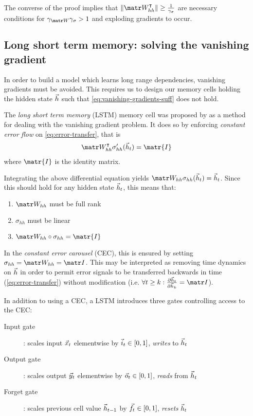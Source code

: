 The converse of the proof implies that $\| \W_{hh}^\tp \| \geq
\frac{1}{\gamma_\sigma}$ are necessary conditions for $\gamma_{\W}
\gamma_\sigma > 1$ and exploding gradients to occur.

\subsection{Long short term memory: solving the vanishing gradient}


In order to build a model which learns long range dependencies, vanishing
gradients must be avoided. This requires us to design our memory cells holding
the hidden state $\vec{h}$ such that \cref{eq:vanishing-gradients-suff} does
not hold.

The \emph{long short term memory} (LSTM) memory cell was proposed by
\citet{hochreiter1997long} as a method for dealing with the vanishing gradient
problem. It does so by enforcing \emph{constant error flow} on
\cref{eq:error-transfer}, that is
\begin{equation}
    \W_{hh}^\tp \sigma_{hh}' (\h_{t}) = \matr{I}
\end{equation}
where $\matr{I}$ is the identity matrix.

Integrating the above differential equation yields $\W_{hh} \sigma_{hh}(\h_{t}) = \h_{t}$.
Since this should hold for any hidden state $\vec{h}_{t}$, this means that:
\begin{enumerate}
    \item $\W_{hh}$ must be full rank
    \item $\sigma_{hh}$ must be linear
    \item $\W_{hh} \circ \sigma_{hh} = \matr{I}$
\end{enumerate}

In the \emph{constant error carousel} (CEC), this is ensured by setting
$\sigma_{hh} = \W_{hh} = \I$. This may be interpreted as removing time dynamics
on $\vec{h}$ in order to permit error signals to be transferred backwards in time
(\cref{eq:error-transfer}) without modification (i.e. $\forall t \geq k: \frac{\pd
\h_t}{\pd \h_k} = \I$).

In addition to using a CEC, a LSTM introduces three gates controlling access to the CEC:
\begin{description}
  \item[Input gate]: scales input $\vec{x}_t$ elementwise by $\vec{i}_t \in [0,1]$, \emph{writes} to $\vec{h}_t$
  \item[Output gate]: scales output $\vec{y}_t$ elementwise by $\vec{o}_t \in [0,1]$, \emph{reads} from $\vec{h}_t$
  \item[Forget gate]: scales previous cell value $\vec{h}_{t-1}$ by $\vec{f}_t \in [0,1]$, \emph{resets} $\vec{h}_t$
\end{description}

